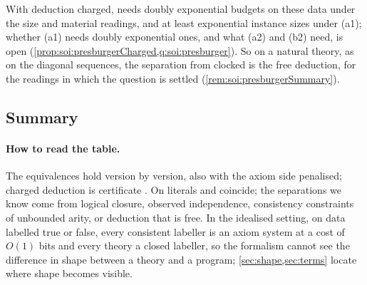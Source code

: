 With deduction charged, \SAIabbr needs doubly exponential budgets on these data under the size and material readings, and at least exponential instance sizes under (a1); whether (a1) needs doubly exponential ones, and what (a2) and (b2) need, is open (\cref{prop:soi:presburgerCharged,q:soi:presburger}). So on a natural theory, as on the diagonal sequences, the separation from clocked \SOIabbr is the free deduction, for the readings in which the question is settled (\cref{rem:soi:presburgerSummary}).

\subsection{Summary}\label{sec:soi:summary}

\paragraph{How to read the table.} The equivalences hold version by version, also with the axiom side penalised; charged deduction is certificate \SOIabbr. On literals \SAIabbr and \SOIabbr coincide; the separations we know come from logical closure, observed independence, consistency constraints of unbounded arity, or deduction that is free. In the idealised setting, on data labelled true or false, every consistent labeller is an axiom system at a cost of $O(1)$ bits and every theory a closed labeller, so the formalism cannot see the difference in shape between a theory and a program; \cref{sec:shape,sec:terms} locate where shape becomes visible.
